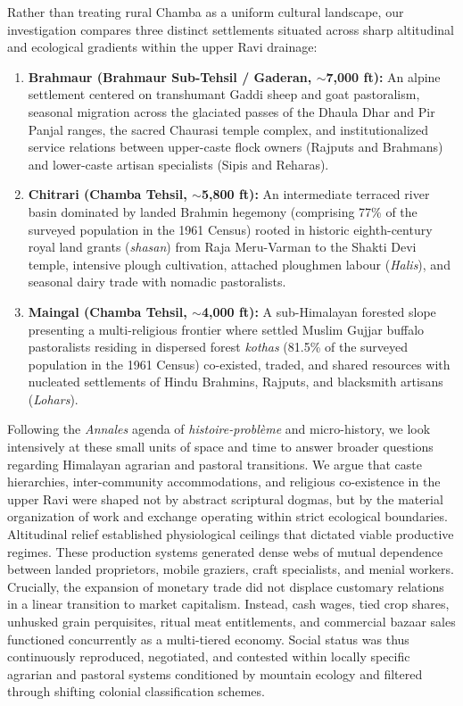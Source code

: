 \documentclass[11pt,a4paper]{article}
\begin{document}
Rather than treating rural Chamba as a uniform cultural landscape, our investigation compares three distinct settlements situated across sharp altitudinal and ecological gradients within the upper Ravi drainage:
\begin{enumerate}[leftmargin=*]
    \item \textbf{Brahmaur (Brahmaur Sub-Tehsil / Gaderan, $\sim$7,000 ft):} An alpine settlement centered on transhumant Gaddi sheep and goat pastoralism, seasonal migration across the glaciated passes of the Dhaula Dhar and Pir Panjal ranges, the sacred Chaurasi temple complex, and institutionalized service relations between upper-caste flock owners (Rajputs and Brahmans) and lower-caste artisan specialists (Sipis and Reharas).
    \item \textbf{Chitrari (Chamba Tehsil, $\sim$5,800 ft):} An intermediate terraced river basin dominated by landed Brahmin hegemony (comprising 77\% of the surveyed population in the 1961 Census) rooted in historic eighth-century royal land grants (\textit{shasan}) from Raja Meru-Varman to the Shakti Devi temple, intensive plough cultivation, attached ploughmen labour (\textit{Halis}), and seasonal dairy trade with nomadic pastoralists.
    \item \textbf{Maingal (Chamba Tehsil, $\sim$4,000 ft):} A sub-Himalayan forested slope presenting a multi-religious frontier where settled Muslim Gujjar buffalo pastoralists residing in dispersed forest \textit{kothas} (81.5\% of the surveyed population in the 1961 Census) co-existed, traded, and shared resources with nucleated settlements of Hindu Brahmins, Rajputs, and blacksmith artisans (\textit{Lohars}).
\end{enumerate}

Following the \textit{Annales} agenda of \textit{histoire-probl\`eme} and micro-history, we look intensively at these small units of space and time to answer broader questions regarding Himalayan agrarian and pastoral transitions. We argue that caste hierarchies, inter-community accommodations, and religious co-existence in the upper Ravi were shaped not by abstract scriptural dogmas, but by the material organization of work and exchange operating within strict ecological boundaries. Altitudinal relief established physiological ceilings that dictated viable productive regimes. These production systems generated dense webs of mutual dependence between landed proprietors, mobile graziers, craft specialists, and menial workers. Crucially, the expansion of monetary trade did not displace customary relations in a linear transition to market capitalism. Instead, cash wages, tied crop shares, unhusked grain perquisites, ritual meat entitlements, and commercial bazaar sales functioned concurrently as a multi-tiered economy. Social status was thus continuously reproduced, negotiated, and contested within locally specific agrarian and pastoral systems conditioned by mountain ecology and filtered through shifting colonial classification schemes.
\end{document}
